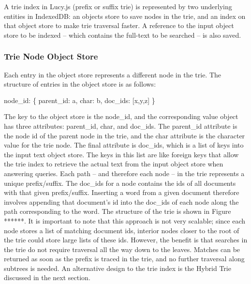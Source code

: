 \documentclass{vldb}
\begin{document}
A trie index in Lucy.js (prefix or suffix trie) is represented by two underlying entities in IndexedDB: an objects store to save nodes in the trie, and an index on that object store to make trie traversal faster.  A reference to the input object store to be indexed -- which contains the full-text to be searched -- is also saved.

\subsubsection{Trie Node Object Store}
Each entry in the object store represents a different node in the trie. The structure of entries in the object store is as follows:
\begin{center}
node\_id: \{ parent\_id: a, char: b, doc\_ids: [x,y,z] \}
\end{center}
The key to the object store is the node\_id, and the corresponding value object has three attributes: parent\_id, char, and doc\_ids. The parent\_id attribute is the node id of the parent node in the trie, and the char attribute is the character value for the trie node. The final attribute is doc\_ids, which is a list of keys into the input text object store. The keys in this list are like foreign keys that allow the trie index to retrieve the actual text from the input object store when answering queries. Each path -- and therefore each node -- in the trie represents a unique prefix/suffix. The doc\_ids for a node contains the ids of all documents with that given prefix/suffix. Inserting a word from a given document therefore involves appending that document's id into the doc\_ids of each node along the path corresponding to the word. The structure of the trie is shown in Figure ******.  It is important to note that this approach is not very scalable; since each node stores a list of matching document ids, interior nodes closer to the root of the trie could store large lists of these ids. However, the benefit is that searches in the trie do not require traversal all the way down to the leaves. Matches can be returned as soon as the prefix is traced in the trie, and no further traversal along subtrees is needed. An alternative design to the trie index is the Hybrid Trie discussed in the next section.
\end{document}
